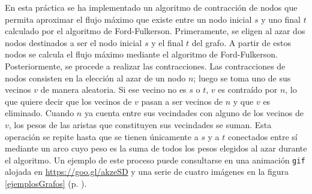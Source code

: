 \documentclass{article}
\begin{document}
  En esta práctica se ha implementado un algoritmo de contracción de nodos que permita aproximar el flujo máximo que existe entre un nodo inicial $s$ y uno final $t$ calculado por el algoritmo de Ford-Fulkerson. Primeramente, se eligen al azar dos nodos destinados a ser el nodo inicial $s$ y el final $t$ del grafo. A partir de estos nodos se calcula el flujo máximo mediante el algoritmo de Ford-Fulkerson. Posteriormente, se procede a realizar las contracciones. Las contracciones de nodos consisten en la elección al azar de un nodo $n$; luego se toma uno de sus vecinos $v$ de manera aleatoria. Si ese vecino no es $s$ o $t$, $v$ es contraído por $n$, lo que quiere decir que los vecinos de $v$ pasan a ser vecinos de $n$ y que $v$ es eliminado. Cuando $n$ ya cuenta entre sus vecindades con alguno de los vecinos de $v$, los pesos de las aristas que constituyen sus vecindades se suman. Esta operación se repite hasta que se tienen únicamente a $s$ y a $t$ conectados entre sí mediante un arco cuyo peso es la suma de todos los pesos elegidos al azar durante el algoritmo. Un ejemplo de este proceso puede consultarse en una animación \texttt{gif} alojada en \url{https://goo.gl/akzeSD} y una serie de cuatro imágenes en la figura \ref{ejemplosGrafos} (p. \pageref{ejemplosGrafos}).
\end{document}
